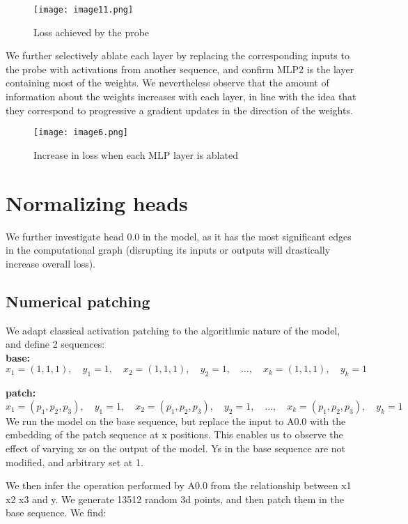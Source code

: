 \documentclass{article}
\begin{document}
\begin{figure}[htbp]
\centering
\texttt{[image: image11.png]}
\caption{Loss achieved by the probe}
\end{figure}

We further selectively ablate each layer by replacing the corresponding inputs to the probe with activations from another sequence, and confirm MLP2 is the layer containing most of the weights. We nevertheless observe that the amount of information about the weights increases with each layer, in line with the idea that they correspond to progressive a gradient updates in the direction of the weights.

\begin{figure}[htbp]
\centering
\texttt{[image: image6.png]}
\caption{Increase in loss when each MLP layer is ablated}
\end{figure}

\section{Normalizing heads}
We further investigate head 0.0 in the model, as it has the most significant edges in the computational graph (disrupting its inputs or outputs will drastically increase overall loss). 
\subsection{Numerical patching}
We adapt classical activation patching \citep{zhang_2023_towards} to the algorithmic nature of the model, and define 2 sequences: \\
\noindent
\textbf{base:} 
\[
x_1 = (1, 1, 1), \quad y_1 = 1, \quad x_2 = (1, 1, 1), \quad y_2 = 1, \quad \ldots, \quad x_k = (1, 1, 1), \quad y_k = 1
\]

\noindent
\textbf{patch:} 
\[
x_1 = (p_1, p_2, p_3), \quad y_1 = 1, \quad x_2 = (p_1, p_2, p_3), \quad y_2 = 1, \quad \ldots, \quad x_k = (p_1, p_2, p_3), \quad y_k = 1
\]
We run the model on the base sequence, but replace the input to A0.0 with the embedding of the patch sequence at x positions. This enables us to observe the effect of varying xs on the output of the model. Ys in the base sequence are not modified, and arbitrary set at 1.

We then infer the operation performed by A0.0 from the relationship between x1 x2 x3 and y. We generate 13512 random 3d points, and then patch them in the base sequence. We find:
\end{document}
